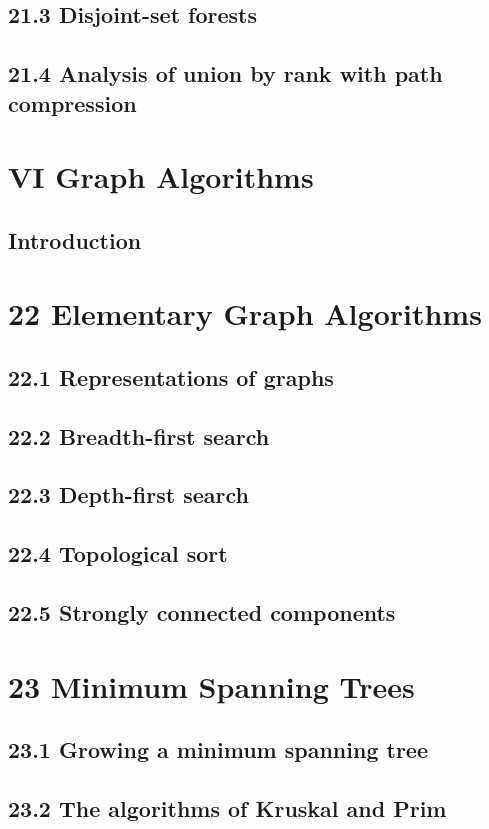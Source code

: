 \documentclass[a4paper]{article}
\begin{document}
\subsection{21.3 Disjoint-set forests}
\subsection{21.4 Analysis of union by rank with path compression}

\newpage
\section*{VI Graph Algorithms}
\subsection*{Introduction}

\newpage
\section{22 Elementary Graph Algorithms}
\subsection{22.1 Representations of graphs}
\subsection{22.2 Breadth-first search}
\subsection{22.3 Depth-first search}
\subsection{22.4 Topological sort}
\subsection{22.5 Strongly connected components}

\newpage
\section{23 Minimum Spanning Trees}
\subsection{23.1 Growing a minimum spanning tree}
\subsection{23.2 The algorithms of Kruskal and Prim}
\end{document}
